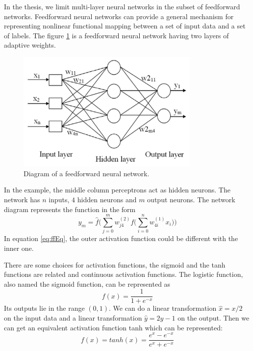 In the thesis, we limit multi-layer neural networks in the subset of feedforward networks. Feedforward neural networks can provide a general mechanism for representing nonlinear functional mapping between a set of input data and a set of labels. The figure \ref{fig:ffnet} is a feedforward neural network having two layers of adaptive weights.

\begin{figure}[!htb]
\centering
\includegraphics[width=0.8\textwidth]{Figure2-2.png}
\caption{\label{fig:ffnet}Diagram of a feedforward neural network\citep{zainal2013oil}.}
\end{figure}

In the example, the middle column perceptrons act as hidden neurons. The network has $n$ inputs, $4$ hidden neurons and $m$ output neurons. The network diagram represents the function in the form
\begin{equation}\label{eq:ffEq}
y_{m} = \hat{f}\Big(\sum_{j=0}^{m}w_{j4}^{(2)}f\big(\sum_{i=0}^{n}w_{4i}^{(1)}x_{i}\big)\Big)
\end{equation}
In equation \ref{eq:ffEq}, the outer activation function could be different with the inner one.

There are some choices for activation functions, the sigmoid and the tanh functions are related and continuous activation functions. The logistic function, also named the sigmoid function, can be represented as 
\begin{equation}\label{eq:sigmoid}
f(x) = \frac{1}{1+e^{-x}}
\end{equation}
Its outputs lie in the range $(0,1)$. We can do a linear transformation $\hat{x}=x/2$ on the input data and a linear transformation $\hat{y}=2y-1$ on the output. Then we can get an equivalent activation function tanh which can be represented:
\begin{equation}\label{eq:tanh}
f(x) = tanh(x) = \frac{e^{x}-e^{-x}}{e^{x}+e^{-x}}
\end{equation}


